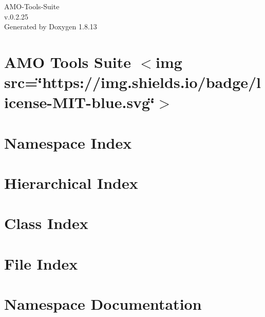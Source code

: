 \documentclass[twoside]{book}
\newcommand{\+}{\discretionary{\mbox{\scriptsize$\hookleftarrow$}}{}{}}
\newcommand{\clearemptydoublepage}{%
  \newpage{\pagestyle{empty}\cleardoublepage}%
}
\begin{document}
\hypersetup{pageanchor=false,
             bookmarksnumbered=true,
             pdfencoding=unicode
            }
\begin{titlepage}
\vspace*{7cm}
\begin{center}%
{\Large A\+M\+O-\/\+Tools-\/\+Suite \\[1ex]\large v.\+0.\+2.\+25 }\\
\vspace*{1cm}
{\large Generated by Doxygen 1.8.13}\\
\end{center}
\end{titlepage}
\clearemptydoublepage
{}
\tableofcontents
\clearemptydoublepage
{}
\hypersetup{pageanchor=true}

\chapter{A\+MO Tools Suite $<$img src=\char`\"{}https\+://img.\+shields.\+io/badge/license-\/\+M\+I\+T-\/blue.\+svg\char`\"{}$>$}
\label{index}\hypertarget{index}{}
\chapter{Namespace Index}

\chapter{Hierarchical Index}

\chapter{Class Index}

\chapter{File Index}

\chapter{Namespace Documentation}

\end{document}
